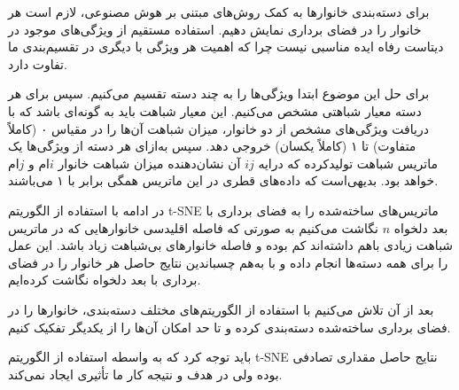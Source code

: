 
برای دسته‌بندی خانوارها به کمک روش‌های مبتنی بر هوش مصنوعی، لازم است هر خانوار را در فضای برداری نمایش دهیم. استفاده مستقیم از ویژگی‌های موجود در دیتاست رفاه ایده مناسبی نیست چرا که اهمیت هر ویژگی با دیگری در تقسیم‌بندی ما تفاوت دارد.

برای حل این موضوع ابتدا ویژگی‌ها را به چند دسته تقسیم می‌کنیم. سپس برای هر دسته معیار شباهتی مشخص می‌کنیم. این معیار شباهت باید به گونه‌ای باشد که با دریافت ویژگی‌های مشخص از دو خانوار، میزان شباهت آن‌ها را  در مقیاس ۰ (کاملاً متفاوت) تا ۱ (کاملاً یکسان) خروجی دهد. سپس به‌ازای هر دسته از ویژگی‌ها یک ماتریس شباهت تولیدکرده که درایه 
$ij$
آن نشان‌دهنده میزان شباهت خانوار 
$i$ام
و
$j$ام
خواهد بود. بدیهی‌است که داده‌های قطری در این ماتریس همگی برابر با ۱ می‌باشند.

در ادامه با استفاده از الگوریتم 
t-SNE
ماتریس‌های ساخته‌شده را به فضای برداری با بعد دلخواه 
$n$
نگاشت می‌کنیم به صورتی که فاصله اقلیدسی خانوارهایی که در ماتریس شباهت زیادی باهم داشته‌اند کم بوده و فاصله خانوارهای بی‌شباهت زیاد باشد.
این عمل را برای همه دسته‌ها انجام داده و با به‌هم چسباندین نتایج حاصل هر خانوار را در فضای برداری با بعد دلخواه نگاشت کرده‌ایم.

بعد از آن تلاش می‌کنیم با استفاده از الگوریتم‌های مختلف دسته‌بندی،‌ خانوارها را در فضای برداری ساخته‌شده دسته‌بندی کرده و تا حد امکان آن‌ها را از یکدیگر تفکیک کنیم.

باید توجه کرد که به واسطه استفاده از الگوریتم 
t-SNE
نتایج حاصل مقداری تصادفی بوده ولی در هدف و نتیجه کار ما تأثیری ایجاد نمی‌کند.